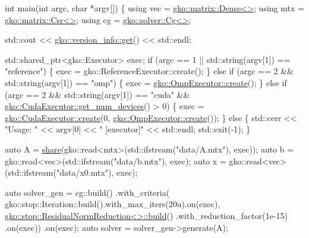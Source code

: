 \begin{DoxyCodeInclude}
\textcolor{keywordtype}{int} main(\textcolor{keywordtype}{int} argc, \textcolor{keywordtype}{char} *argv[])
\{
    \textcolor{keyword}{using} vec = \hyperlink{classgko_1_1matrix_1_1Dense}{gko::matrix::Dense<>};
    \textcolor{keyword}{using} mtx = \hyperlink{classgko_1_1matrix_1_1Csr}{gko::matrix::Csr<>};
    \textcolor{keyword}{using} cg = \hyperlink{classgko_1_1solver_1_1Cg}{gko::solver::Cg<>};

    std::cout << \hyperlink{classgko_1_1version__info_a6daeb8a087cfb57fa055526fc133d8eb}{gko::version\_info::get}() << std::endl;

    std::shared\_ptr<gko::Executor> exec;
    \textcolor{keywordflow}{if} (argc == 1 || std::string(argv[1]) == \textcolor{stringliteral}{"reference"}) \{
        exec = gko::ReferenceExecutor::create();
    \} \textcolor{keywordflow}{else} \textcolor{keywordflow}{if} (argc == 2 && std::string(argv[1]) == \textcolor{stringliteral}{"omp"}) \{
        exec = \hyperlink{classgko_1_1OmpExecutor_a33ca05fdd0fc928ee262fc9425304874}{gko::OmpExecutor::create}();
    \} \textcolor{keywordflow}{else} \textcolor{keywordflow}{if} (argc == 2 && std::string(argv[1]) == \textcolor{stringliteral}{"cuda"} &&
               \hyperlink{classgko_1_1CudaExecutor_aef0258494d14de0e56149b920c5173e5}{gko::CudaExecutor::get\_num\_devices}() > 0) \{
        exec = \hyperlink{classgko_1_1CudaExecutor_a2718a92034350650ef406ffdb60db090}{gko::CudaExecutor::create}(0, 
      \hyperlink{classgko_1_1OmpExecutor_a33ca05fdd0fc928ee262fc9425304874}{gko::OmpExecutor::create}());
    \} \textcolor{keywordflow}{else} \{
        std::cerr << \textcolor{stringliteral}{"Usage: "} << argv[0] << \textcolor{stringliteral}{" [executor]"} << std::endl;
        std::exit(-1);
    \}

    \textcolor{keyword}{auto} A = \hyperlink{namespacegko_a3ce296f73db0ff398bdea6009a3a5c58}{share}(gko::read<mtx>(std::ifstream(\textcolor{stringliteral}{"data/A.mtx"}), exec));
    \textcolor{keyword}{auto} b = gko::read<vec>(std::ifstream(\textcolor{stringliteral}{"data/b.mtx"}), exec);
    \textcolor{keyword}{auto} x = gko::read<vec>(std::ifstream(\textcolor{stringliteral}{"data/x0.mtx"}), exec);

    \textcolor{keyword}{auto} solver\_gen =
        cg::build()
            .with\_criteria(
                gko::stop::Iteration::build().with\_max\_iters(20u).on(exec),
                \hyperlink{classgko_1_1stop_1_1ResidualNormReduction}{gko::stop::ResidualNormReduction<>::build}()
                    .with\_reduction\_factor(1e-15)
                    .on(exec))
            .on(exec);
    \textcolor{keyword}{auto} solver = solver\_gen->generate(A);


\end{DoxyCodeInclude}
